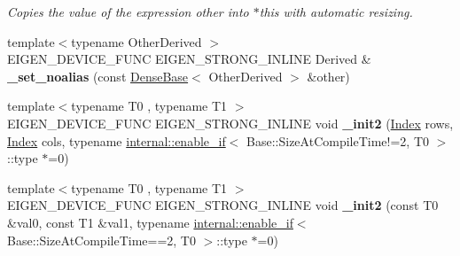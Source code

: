 \begin{DoxyCompactItemize}
\begin{DoxyCompactList}\small\item\em Copies the value of the expression {\itshape other} into {\ttfamily $\ast$this} with automatic resizing. \end{DoxyCompactList}\item 
\mbox{\label{class_eigen_1_1_plain_object_base_a28cdcf06eb94c404cd327a5b7b806789}} 
{\footnotesize template$<$typename Other\+Derived $>$ }\\E\+I\+G\+E\+N\+\_\+\+D\+E\+V\+I\+C\+E\+\_\+\+F\+U\+NC E\+I\+G\+E\+N\+\_\+\+S\+T\+R\+O\+N\+G\+\_\+\+I\+N\+L\+I\+NE Derived \& {\bfseries \+\_\+set\+\_\+noalias} (const \hyperlink{group___core___module_class_eigen_1_1_dense_base}{Dense\+Base}$<$ Other\+Derived $>$ \&other)
\item 
\mbox{\label{class_eigen_1_1_plain_object_base_ac919a0a42914a190ba025fb8a3467c6b}} 
{\footnotesize template$<$typename T0 , typename T1 $>$ }\\E\+I\+G\+E\+N\+\_\+\+D\+E\+V\+I\+C\+E\+\_\+\+F\+U\+NC E\+I\+G\+E\+N\+\_\+\+S\+T\+R\+O\+N\+G\+\_\+\+I\+N\+L\+I\+NE void {\bfseries \+\_\+init2} (\hyperlink{namespace_eigen_a62e77e0933482dafde8fe197d9a2cfde}{Index} rows, \hyperlink{namespace_eigen_a62e77e0933482dafde8fe197d9a2cfde}{Index} cols, typename \hyperlink{struct_eigen_1_1internal_1_1enable__if}{internal\+::enable\+\_\+if}$<$ Base\+::\+Size\+At\+Compile\+Time!=2, T0 $>$\+::type $\ast$=0)
\item 
\mbox{\label{class_eigen_1_1_plain_object_base_adf6cee011f287daa6488e269c80f3c1c}} 
{\footnotesize template$<$typename T0 , typename T1 $>$ }\\E\+I\+G\+E\+N\+\_\+\+D\+E\+V\+I\+C\+E\+\_\+\+F\+U\+NC E\+I\+G\+E\+N\+\_\+\+S\+T\+R\+O\+N\+G\+\_\+\+I\+N\+L\+I\+NE void {\bfseries \+\_\+init2} (const T0 \&val0, const T1 \&val1, typename \hyperlink{struct_eigen_1_1internal_1_1enable__if}{internal\+::enable\+\_\+if}$<$ Base\+::\+Size\+At\+Compile\+Time==2, T0 $>$\+::type $\ast$=0)
\item 
\mbox{\label{class_eigen_1_1_plain_object_base_a2847adb1d1c4f388541cc36db1e3349d}} 

\end{DoxyCompactItemize}
